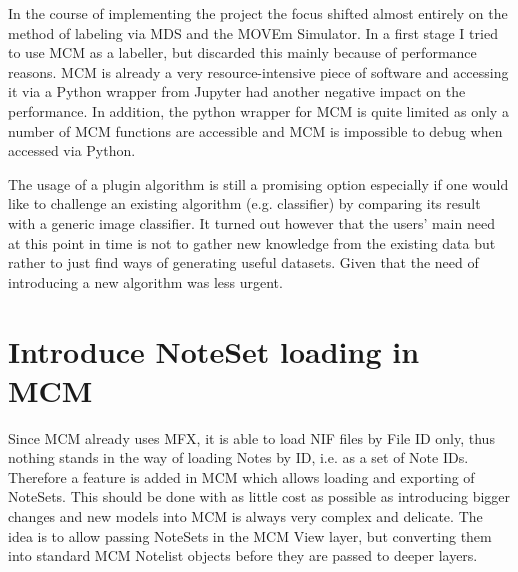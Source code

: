 In the course of implementing the project the focus shifted almost entirely on the method of labeling via MDS and the MOVEm Simulator. In a first stage I tried to use MCM as a labeller, but discarded this mainly because of performance reasons. MCM is already a very resource-intensive piece of software and accessing it via a Python wrapper from Jupyter had another negative impact on the performance. In addition, the python wrapper for MCM is quite limited as only a number of MCM functions are accessible and MCM is impossible to debug when accessed via Python. \par
The usage of a plugin algorithm is still a promising option especially if one would like to challenge an existing algorithm (e.g. classifier) by comparing its result with a generic image classifier. It turned out however that the users' main need at this point in time is not to gather new knowledge from the existing data but rather to just find ways of generating useful datasets. Given that the need of introducing a new algorithm was less urgent. 

\section{Introduce NoteSet loading in MCM}
Since MCM already uses MFX, it is able to load NIF files by File ID only, thus nothing stands in the way of loading Notes by ID, i.e. as a set of Note IDs. Therefore a feature is added in MCM which allows loading and exporting of NoteSets. This should be done with as little cost as possible as introducing bigger changes and new models into MCM is always very complex and delicate. The idea is to allow passing NoteSets in the MCM View layer, but converting them into standard MCM Notelist objects before they are passed to deeper layers. 
